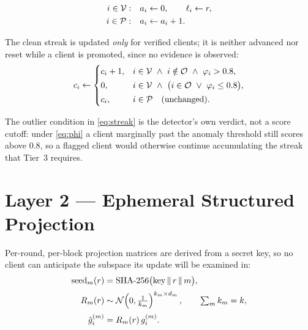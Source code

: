 
\begin{align}
i \in \mathcal{V}:&\quad a_i \leftarrow 0,\qquad \ell_i \leftarrow r,
\label{eq:reset}\\
i \in \mathcal{P}:&\quad a_i \leftarrow a_i + 1.
\label{eq:advance}
\end{align}

The clean streak is updated \emph{only} for verified clients; it is neither
advanced nor reset while a client is promoted, since no evidence is observed:
\begin{equation}
c_i \leftarrow
\begin{cases}
c_i + 1, & i \in \mathcal{V} \ \wedge\ i \notin \mathcal{O} \ \wedge\ \varphi_i > 0.8,\\[2pt]
0,       & i \in \mathcal{V} \ \wedge\ \bigl(i \in \mathcal{O} \ \vee\ \varphi_i \le 0.8\bigr),\\[2pt]
c_i,     & i \in \mathcal{P} \quad\text{(unchanged).}
\end{cases}
\label{eq:streak}
\end{equation}

The outlier condition in \eqref{eq:streak} is the detector's own verdict, not a
score cutoff: under \eqref{eq:phi} a client marginally past the anomaly
threshold still scores above $0.8$, so a flagged client would otherwise
continue accumulating the streak that Tier~3 requires.

\section{Layer 2 --- Ephemeral Structured Projection}

Per-round, per-block projection matrices are derived from a secret key, so no
client can anticipate the subspace its update will be examined in:
\begin{align}
\mathrm{seed}_m(r) &= \mathrm{SHA\text{-}256}\bigl(\text{key} \,\|\, r \,\|\, m\bigr),
\label{eq:seed}\\[2pt]
R_m(r) &\sim \mathcal{N}\!\left(0, \tfrac{1}{k_m}\right)^{k_m \times d_m},
\qquad \textstyle\sum_m k_m = k,
\label{eq:projmat}\\[2pt]
\hat{g}_i^{(m)} &= R_m(r)\, g_i^{(m)}.
\label{eq:project}
\end{align}


